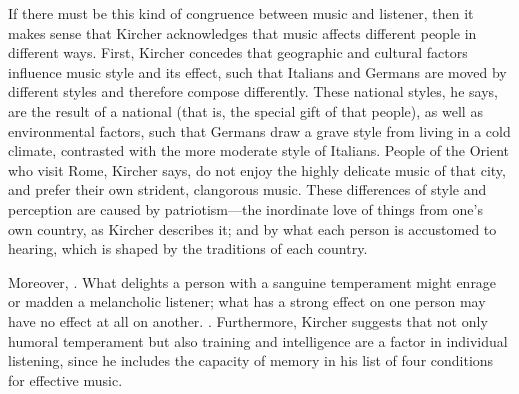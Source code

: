 If there must be this kind of congruence between music and listener, then it 
makes sense that Kircher acknowledges that music affects different people in 
different ways.
First, Kircher concedes that geographic and cultural factors influence music 
style and its effect, such that Italians and Germans are moved by different 
styles and therefore compose differently.
These national styles, he says, are the result of a national  
(that is, the special gift of that people), as well as environmental factors, 
such that Germans draw a grave style from living in a cold climate, contrasted 
with the more moderate style of Italians.
People of the Orient who visit Rome, Kircher says, do not enjoy the highly 
delicate music of that city, and prefer their own strident, clangorous music.
These differences of style and perception are caused by patriotism---the 
inordinate love of things from one's own country, as Kircher describes it; and 
by what each person is accustomed to hearing, which is shaped by the traditions 
of each country.%
    \Autocite[543--544]{Kircher:Musurgia} %

Moreover, .%
    \Autocite
    [544: .]
    {Kircher:Musurgia}
What delights a person with a sanguine temperament might enrage or madden a 
melancholic listener; what has a strong effect on one person may have no effect 
at all on another.%
    \Autocite[550]{Kircher:Musurgia}
.%
    \Autocite[550: .]
    {Kircher:Musurgia}
Furthermore, Kircher suggests that not only humoral temperament but also
training and intelligence are a factor in individual listening, since he
includes the capacity of memory in his list of four conditions for effective
music.

